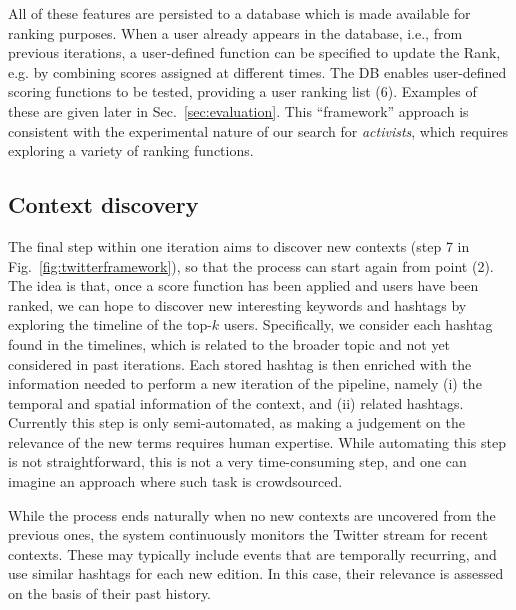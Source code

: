 All of these features are persisted to a database which is made available for ranking purposes.
When a user already appears in the database, i.e., from previous iterations, a user-defined function can be specified to update the Rank, e.g. by combining scores assigned at different times.
%
The DB enables user-defined scoring functions to be tested, providing a user ranking list (6). Examples of these are given later in Sec.~\ref{sec:evaluation}.
This ``framework'' approach is consistent with the experimental nature of our search for \textit{activists}, which requires exploring a variety of ranking functions.

\subsection{Context discovery} \label{sec:context-discovery}

The final step within one iteration aims to discover new contexts (step 7 in Fig.~\ref{fig:twitterframework}), so that the process can start again from point (2).
The idea is that, once a score function has been applied and users have been ranked, we can hope to discover new interesting keywords and hashtags by exploring the timeline of the top-$k$ users.
Specifically,  we consider each hashtag found in the timelines, which is related to the broader topic and not yet considered in past iterations.
Each stored hashtag is then enriched with the information needed to perform a new iteration of the pipeline, namely (i) the temporal and spatial information of the context, and (ii) related hashtags.
%
Currently this step is only semi-automated, as making a judgement on the relevance of the new terms requires  human expertise.
While automating this step is not straightforward, this is not a very time-consuming step, and one can imagine an approach where such task is crowdsourced.

While the process ends naturally when no new contexts are uncovered from the previous ones, the system continuously monitors the Twitter stream for recent contexts. These may typically include events that are temporally recurring, and use similar hashtags for each new edition. In this case, their relevance is assessed on the basis of their past history.